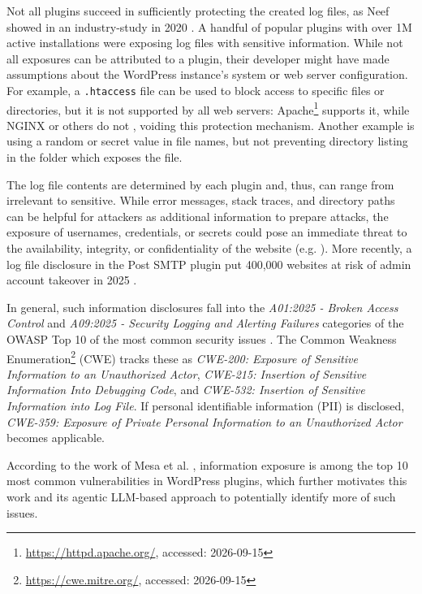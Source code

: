 \documentclass[sigconf]{acmart}
\begin{document}
Not all plugins succeed in sufficiently protecting the created log files, as Neef showed in an industry-study in 2020 \cite{detectifyWordpressPlugins}. 
A handful of popular plugins with over 1M active installations were exposing log files with sensitive information.
While not all exposures can be attributed to a plugin, their developer might have made assumptions about the WordPress instance's system or web server configuration.
For example, a \texttt{.htaccess} file can be used to block access to specific files or directories, but it is not supported by all web servers: Apache\footnote{\url{https://httpd.apache.org/}, accessed: 2026-09-15} supports it, while NGINX or others do not \cite{archiveNGINXLikeApache}, voiding this protection mechanism.
Another example is using a random or secret value in file names, but not preventing directory listing in the folder which exposes the file.

The log file contents are determined by each plugin and, thus, can range from irrelevant to sensitive. 
While error messages, stack traces, and directory paths can be helpful for attackers as additional information to prepare attacks, the exposure of usernames, credentials, or secrets could pose an immediate threat to the availability, integrity, or confidentiality of the website (e.g. \cite{easywpsmtp0day,sentineloneCVE202413513Oliver,managedwpMitigatingSensitive}).
More recently, a log file disclosure in the Post SMTP plugin put 400,000 websites at risk of admin account takeover in 2025 \cite{postsmtp0day}.

In general, such information disclosures fall into the \emph{A01:2025 - Broken Access Control} and \emph{A09:2025 - Security Logging and Alerting Failures} categories of the OWASP Top 10 of the most common security issues \cite{owaspOWASP102025}.
The Common Weakness Enumeration\footnote{\url{https://cwe.mitre.org/}, accessed: 2026-09-15} (CWE) tracks these as \emph{CWE-200: Exposure of Sensitive Information to an Unauthorized Actor}, \emph{CWE-215: Insertion of Sensitive Information Into Debugging Code}, and \emph{CWE-532: Insertion of Sensitive Information into Log File}.
If personal identifiable information (PII) is disclosed, \emph{CWE-359: Exposure of Private Personal Information to an Unauthorized Actor} becomes applicable.

According to the work of Mesa et al. \cite{10.1145/3233027.3233042}, information exposure is among the top 10 most common vulnerabilities in WordPress plugins, which further motivates this work and its agentic LLM-based approach to potentially identify more of such issues.
\end{document}
